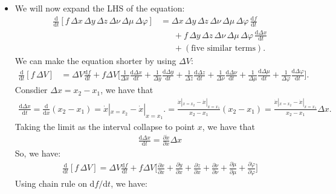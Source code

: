 \documentclass[10pt]{article}
\newcommand{\dee}{\mathrm{d}}
\begin{document}
\begin{itemize}
    \item We will now expand the LHS of the equation:
    \begin{align*}
      \frac{\dee}{\dee t}[f\,\Delta x\, \Delta y\, \Delta z\, \Delta \nu\, \Delta \mu\, \Delta \varphi]
      &= \Delta x\, \Delta y\, \Delta z\, \Delta \nu\, \Delta \mu\, \Delta \varphi\, \frac{\dee f}{\dee t} \\
      &\phantom{\ =}+ f\, \Delta y\, \Delta z\, \Delta \nu\, \Delta \mu\, \Delta \varphi\, \frac{\dee \Delta x}{\dee t} \\
      &\phantom{\ =}+ (\mbox{five similar terms}).
    \end{align*}
    We can make the equation shorter by using $\Delta V$:
    \begin{align*}
      \frac{\dee}{\dee t}[f\,\Delta V]
      &= \Delta V \frac{\dee f}{\dee t}
      + f \Delta V \bigg[ 
          \frac{1}{\Delta x} \frac{\dee \Delta x}{\dee t} 
        + \frac{1}{\Delta y} \frac{\dee \Delta y}{\dee t} 
        + \frac{1}{\Delta z} \frac{\dee \Delta z}{\dee t} 
        + \frac{1}{\Delta \nu} \frac{\dee \Delta \nu}{\dee t} 
        + \frac{1}{\Delta \mu} \frac{\dee \Delta \mu}{\dee t} 
        + \frac{1}{\Delta \varphi} \frac{\dee \Delta \varphi}{\dee t} 
      \bigg].
    \end{align*}
    Consdier $\Delta x = x_2 - x_1$, we have that
    \begin{align*}
      \frac{\dee \Delta x}{\dee t} 
      = \frac{\dee}{\dee x}(x_2 - x_1) 
      = \dot x|_{x=x_2} - \dot x|_{x=x_1}.
      = \frac{\dot x|_{x=x_2} - \dot x|_{x=x_1}}{x_2 - x_1} (x_2 - x_1)
      = \frac{\dot x|_{x=x_2} - \dot x|_{x=x_1}}{x_2 - x_1} \Delta x.
    \end{align*}
    Taking the limit as the interval collapse to point $x$, we have that
    \begin{align*}
      \frac{\dee \Delta x}{\dee t}  = \frac{\partial \dot x}{\partial x} \Delta x
    \end{align*}
    So, we have:
    \begin{align*}
      \frac{\dee}{\dee t}[f\,\Delta V]
      = \Delta V \frac{\dee f}{\dee t}
      + f \Delta V \bigg[ 
          \frac{\partial \dot x}{\partial x}
        + \frac{\partial \dot y}{\partial x}
        + \frac{\partial \dot z}{\partial x}
        + \frac{\partial \dot \nu}{\partial \nu}
        + \frac{\partial \dot \mu}{\partial \mu}
        + \frac{\partial \dot \varphi}{\partial \varphi}
      \bigg]
    \end{align*}
    Using chain rule on $\dee f / \dee t$, we have:

\end{itemize}
\end{document}
